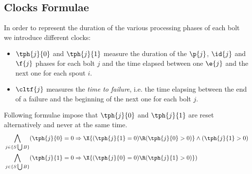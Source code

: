 %
%
%

%

\subsection*{Clocks Formulae}
In order to represent the duration of the various processing phases of each bolt we introduce different clocks:
\begin{itemize}
	\item \textbf{$ \tph{j}{0} $} and \textbf{$ \tph{j}{1} $} measure the duration of the $ \p{j} $, $ \id{j} $ and $ \f{j} $ phases for each bolt $ j $ and the time elapsed between one $ \e{j} $ and the next one for each spout $ i $.
	\item \textbf{$ \cltf{j} $} measures the \textit{time to failure}, i.e. the time elapsing between the end of a failure and the beginning of the next one for each bolt $ j $.
\end{itemize}
%
Following formulae impose that $\tph{j}{0}$ and $\tph{j}{1}$ are reset alternatively and never at the same time.
\begin{align*}
%
& \bigwedge_{
	\begin{subarray}{c}
	j \in \{ S \bigcup  B \}\\
	\end{subarray}
	}
	(\tph{j}{0} =  0 \Rightarrow \X{(\tph{j}{1} = 0) \R (\tph{j}{0}>0)} \land (\tph{j}{1} > 0) \\
	& \bigwedge_{
	\begin{subarray}{c}
	j \in \{ S \bigcup  B \}\\
	\end{subarray}
	}
	(\tph{j}{1} =  0 \Rightarrow \X{(\tph{j}{0} = 0) \R (\tph{j}{1}>0)})	
		\end{align*}

